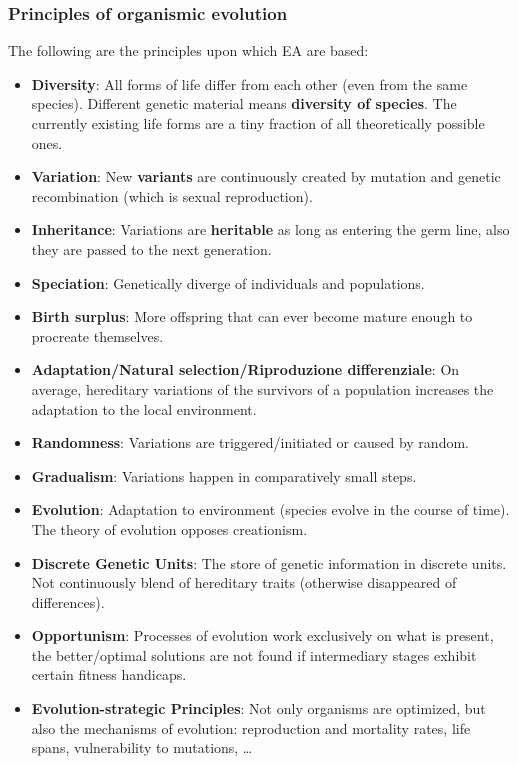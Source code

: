 \documentclass{article}
\begin{document}
\subsubsection{Principles of organismic evolution}
The following are the principles upon which EA are based:
\begin{itemize}
    \item \textbf{Diversity}: All forms of life differ from each other (even from the same species). Different genetic material
          means \textbf{diversity of species}. The currently existing life forms are a tiny fraction of
          all theoretically possible ones.
    \item \textbf{Variation}: New \textbf{variants} are continuously created by mutation and genetic recombination (which is sexual reproduction).
    \item \textbf{Inheritance}: Variations are \textbf{heritable} as long as entering the germ line, also they are passed to the next
          generation.
    \item \textbf{Speciation}: Genetically diverge of individuals and populations.
    \item \textbf{Birth surplus}: More offspring that can ever become mature enough to procreate
          themselves.
    \item \textbf{Adaptation/Natural selection/Riproduzione differenziale}: On average, hereditary
          variations of the survivors of a population increases the adaptation to the local environment.
    \item \textbf{Randomness}: Variations are triggered/initiated or caused by random.
    \item \textbf{Gradualism}: Variations happen in comparatively small steps.
    \item \textbf{Evolution}: Adaptation to environment (species evolve in the course of time). The
          theory of evolution opposes creationism.
    \item \textbf{Discrete Genetic Units}: The store of genetic information in discrete units. Not
          continuously blend of hereditary traits (otherwise disappeared of differences).
    \item \textbf{Opportunism}: Processes of evolution work exclusively on what is present, the
          better/optimal solutions are not found if intermediary stages exhibit certain fitness handicaps.
    \item \textbf{Evolution-strategic Principles}: Not only organisms are optimized, but also the
          mechanisms of evolution: reproduction and mortality rates, life spans, vulnerability to mutations, \dots

\end{itemize}
\end{document}
